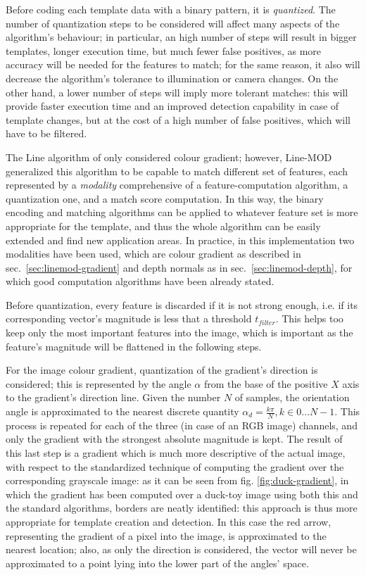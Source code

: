 Before coding each template data with a binary pattern, it is
\emph{quantized}. The number of quantization steps to be considered
will affect many aspects of the algorithm's behaviour; in particular,
an high number of steps will result in bigger templates, longer
execution time, but much fewer false positives, as more accuracy will
be needed for the features to match; for the same reason, it also will
decrease the algorithm's tolerance to illumination or camera
changes. On the other hand, a lower number of steps will imply more
tolerant matches: this will provide faster execution time and an
improved detection capability in case of template changes, but at the
cost of a high number of false positives, which will have to be filtered.

The Line algorithm of \cite{linemod-origins} only considered colour gradient; however, Line-MOD
generalized this algorithm to be capable to match different set of
features, each represented by a \emph{modality} comprehensive of a
feature-computation algorithm, a quantization one, and a match score
computation. In this way, the binary encoding and matching algorithms
can be applied to whatever feature set is more appropriate for the
template, and thus the whole algorithm can be easily extended and find
new application areas. In practice, in this implementation two
modalities have been used, which are colour gradient as described in
sec.~\ref{sec:linemod-gradient} and depth normals as in
sec.~\ref{sec:linemod-depth}, for which good computation algorithms have
been already stated.

Before quantization, every feature is discarded if it is not strong
enough, i.e. if its corresponding vector's magnitude is less that a
threshold $t_{filter}$. This helps too keep only the most important
features into the image, which is important as the feature's magnitude
will be flattened in the following steps.

For the image colour gradient, quantization of the gradient's direction is
considered; this is represented by the angle $\alpha$ from the
base of the positive $X$ axis to the gradient's direction line. Given
the number $N$ of samples, the orientation angle is approximated to
the nearest discrete quantity $\alpha_d = \frac{k\pi}{N}, k \in
{0\dots N-1}$. 
This process is repeated for each of the three (in case of an RGB
image) channels, and only the gradient with the strongest absolute
magnitude is kept. The result of this last step is a gradient which is
much more descriptive of the actual image, with respect to the
standardized technique of computing the gradient over the
corresponding grayscale image: as it can be seen from
fig. \ref{fig:duck-gradient}, in which the gradient has been computed
over a duck-toy image using both this and the standard algorithms,
borders are neatly identified: this approach is thus more appropriate for
template creation and detection. In this case the red arrow,
representing the gradient of a pixel into the image, is approximated
to the nearest location; also, as only the direction is considered,
the vector will never be approximated to a point lying into the lower
part of the angles' space.

